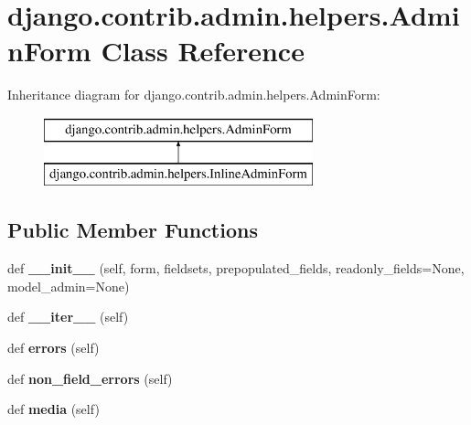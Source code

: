 \hypertarget{classdjango_1_1contrib_1_1admin_1_1helpers_1_1_admin_form}{}\section{django.\+contrib.\+admin.\+helpers.\+Admin\+Form Class Reference}
\label{classdjango_1_1contrib_1_1admin_1_1helpers_1_1_admin_form}
Inheritance diagram for django.\+contrib.\+admin.\+helpers.\+Admin\+Form\+:\begin{figure}[H]
\begin{center}
\leavevmode
\includegraphics[height=2.000000cm]{classdjango_1_1contrib_1_1admin_1_1helpers_1_1_admin_form}
\end{center}
\end{figure}
\subsection*{Public Member Functions}
\begin{DoxyCompactItemize}
\item 
\mbox{\label{classdjango_1_1contrib_1_1admin_1_1helpers_1_1_admin_form_ad58439954ad2f3c6d6565ae8b9024469}} 
def {\bfseries \+\_\+\+\_\+init\+\_\+\+\_\+} (self, form, fieldsets, prepopulated\+\_\+fields, readonly\+\_\+fields=None, model\+\_\+admin=None)
\item 
\mbox{\label{classdjango_1_1contrib_1_1admin_1_1helpers_1_1_admin_form_ab0ef51f3bb2bf13755036b46f5ece369}} 
def {\bfseries \+\_\+\+\_\+iter\+\_\+\+\_\+} (self)
\item 
\mbox{\label{classdjango_1_1contrib_1_1admin_1_1helpers_1_1_admin_form_a452ed01862d9f4fc9e2cf999d2c8888d}} 
def {\bfseries errors} (self)
\item 
\mbox{\label{classdjango_1_1contrib_1_1admin_1_1helpers_1_1_admin_form_afec3f1f4f28b818825b1e409eae62aa6}} 
def {\bfseries non\+\_\+field\+\_\+errors} (self)
\item 
\mbox{\label{classdjango_1_1contrib_1_1admin_1_1helpers_1_1_admin_form_a91f83f321b784be7877e311baf318562}} 
def {\bfseries media} (self)
\end{DoxyCompactItemize}
